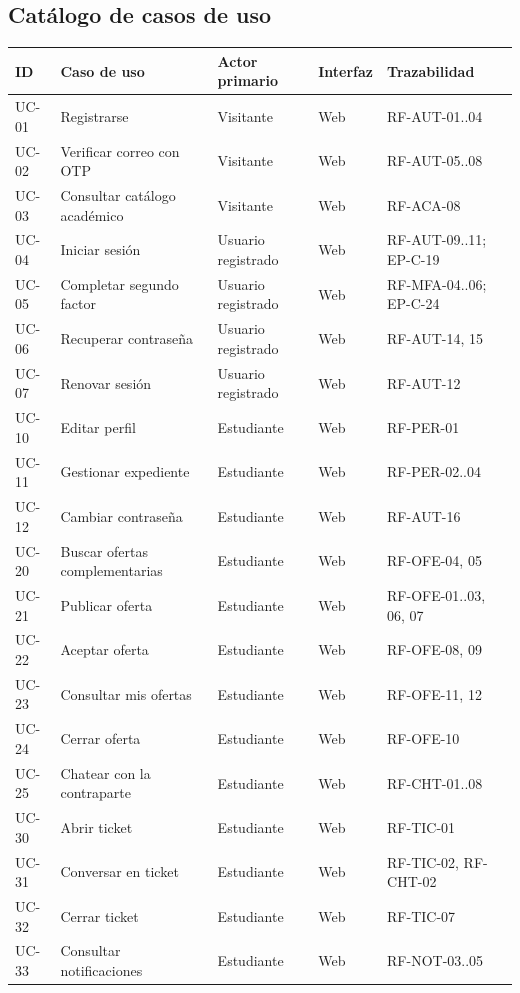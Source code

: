 \documentclass[11pt,a4paper]{report}
\begin{document}
\subsection{Catálogo de casos de uso}
\begin{center}\small
\begin{longtable}{@{}lp{6.0cm}p{3.2cm}p{1.7cm}p{3.0cm}@{}}
\toprule
ID & Caso de uso & Actor primario & Interfaz & Trazabilidad \\
\midrule
\endhead
UC-01 & Registrarse & Visitante & Web & RF-AUT-01..04\\
UC-02 & Verificar correo con OTP & Visitante & Web & RF-AUT-05..08\\
UC-03 & Consultar catálogo académico & Visitante & Web & RF-ACA-08\\
UC-04 & Iniciar sesión & Usuario registrado & Web & RF-AUT-09..11; EP-C-19\\
UC-05 & Completar segundo factor & Usuario registrado & Web & RF-MFA-04..06; EP-C-24\\
UC-06 & Recuperar contraseña & Usuario registrado & Web & RF-AUT-14, 15\\
UC-07 & Renovar sesión & Usuario registrado & Web & RF-AUT-12\\
UC-10 & Editar perfil & Estudiante & Web & RF-PER-01\\
UC-11 & Gestionar expediente & Estudiante & Web & RF-PER-02..04\\
UC-12 & Cambiar contraseña & Estudiante & Web & RF-AUT-16\\
UC-20 & Buscar ofertas complementarias & Estudiante & Web & RF-OFE-04, 05\\
UC-21 & Publicar oferta & Estudiante & Web & RF-OFE-01..03, 06, 07\\
UC-22 & Aceptar oferta & Estudiante & Web & RF-OFE-08, 09\\
UC-23 & Consultar mis ofertas & Estudiante & Web & RF-OFE-11, 12\\
UC-24 & Cerrar oferta & Estudiante & Web & RF-OFE-10\\
UC-25 & Chatear con la contraparte & Estudiante & Web & RF-CHT-01..08\\
UC-30 & Abrir ticket & Estudiante & Web & RF-TIC-01\\
UC-31 & Conversar en ticket & Estudiante & Web & RF-TIC-02, RF-CHT-02\\
UC-32 & Cerrar ticket & Estudiante & Web & RF-TIC-07\\
UC-33 & Consultar notificaciones & Estudiante & Web & RF-NOT-03..05\\

\end{longtable}
\end{center}
\end{document}
